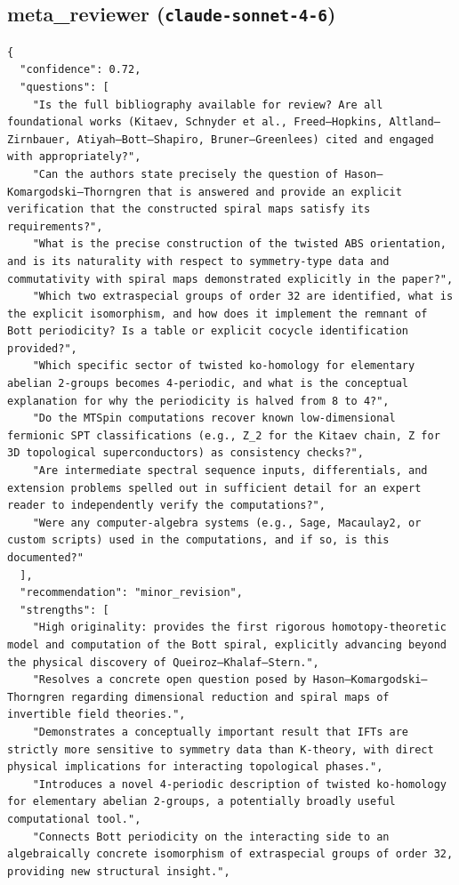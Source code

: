 \documentclass[11pt]{article}
\begin{document}
\subsection*{meta_reviewer (\texttt{claude-sonnet-4-6})}
\begin{verbatim}
{
  "confidence": 0.72,
  "questions": [
    "Is the full bibliography available for review? Are all foundational works (Kitaev, Schnyder et al., Freed–Hopkins, Altland–Zirnbauer, Atiyah–Bott–Shapiro, Bruner–Greenlees) cited and engaged with appropriately?",
    "Can the authors state precisely the question of Hason–Komargodski–Thorngren that is answered and provide an explicit verification that the constructed spiral maps satisfy its requirements?",
    "What is the precise construction of the twisted ABS orientation, and is its naturality with respect to symmetry-type data and commutativity with spiral maps demonstrated explicitly in the paper?",
    "Which two extraspecial groups of order 32 are identified, what is the explicit isomorphism, and how does it implement the remnant of Bott periodicity? Is a table or explicit cocycle identification provided?",
    "Which specific sector of twisted ko-homology for elementary abelian 2-groups becomes 4-periodic, and what is the conceptual explanation for why the periodicity is halved from 8 to 4?",
    "Do the MTSpin computations recover known low-dimensional fermionic SPT classifications (e.g., Z_2 for the Kitaev chain, Z for 3D topological superconductors) as consistency checks?",
    "Are intermediate spectral sequence inputs, differentials, and extension problems spelled out in sufficient detail for an expert reader to independently verify the computations?",
    "Were any computer-algebra systems (e.g., Sage, Macaulay2, or custom scripts) used in the computations, and if so, is this documented?"
  ],
  "recommendation": "minor_revision",
  "strengths": [
    "High originality: provides the first rigorous homotopy-theoretic model and computation of the Bott spiral, explicitly advancing beyond the physical discovery of Queiroz–Khalaf–Stern.",
    "Resolves a concrete open question posed by Hason–Komargodski–Thorngren regarding dimensional reduction and spiral maps of invertible field theories.",
    "Demonstrates a conceptually important result that IFTs are strictly more sensitive to symmetry data than K-theory, with direct physical implications for interacting topological phases.",
    "Introduces a novel 4-periodic description of twisted ko-homology for elementary abelian 2-groups, a potentially broadly useful computational tool.",
    "Connects Bott periodicity on the interacting side to an algebraically concrete isomorphism of extraspecial groups of order 32, providing new structural insight.",

\end{verbatim}
\end{document}
